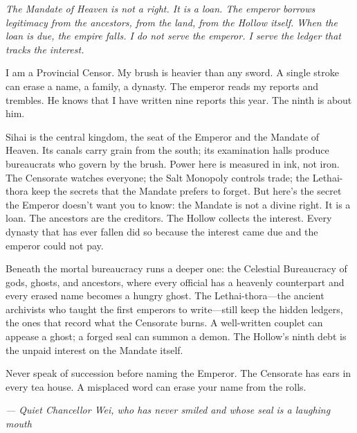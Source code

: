\noindent
{\Large
\textit{The Mandate of Heaven is not a right. It is a loan. The emperor borrows legitimacy from the ancestors, from the land, from the Hollow itself. When the loan is due, the empire falls. I do not serve the emperor. I serve the ledger that tracks the interest.}

\vspace{0.5em}

I am a Provincial Censor. My brush is heavier than any sword. A single stroke can erase a name, a family, a dynasty. The emperor reads my reports and trembles. He knows that I have written nine reports this year. The ninth is about him.

\vspace{0.5em}

Sihai is the central kingdom, the seat of the Emperor and the Mandate of Heaven. Its canals carry grain from the south; its examination halls produce bureaucrats who govern by the brush. Power here is measured in ink, not iron. The Censorate watches everyone; the Salt Monopoly controls trade; the Lethai-thora keep the secrets that the Mandate prefers to forget. But here's the secret the Emperor doesn't want you to know: the Mandate is not a divine right. It is a loan. The ancestors are the creditors. The Hollow collects the interest. Every dynasty that has ever fallen did so because the interest came due and the emperor could not pay.

\vspace{0.5em}

Beneath the mortal bureaucracy runs a deeper one: the Celestial Bureaucracy of gods, ghosts, and ancestors, where every official has a heavenly counterpart and every erased name becomes a hungry ghost. The Lethai-thora---the ancient archivists who taught the first emperors to write---still keep the hidden ledgers, the ones that record what the Censorate burns. A well-written couplet can appease a ghost; a forged seal can summon a demon. The Hollow's ninth debt is the unpaid interest on the Mandate itself.

\vspace{0.5em}

Never speak of succession before naming the Emperor. The Censorate has ears in every tea house. A misplaced word can erase your name from the rolls.

\vspace{1em}

\noindent\textit{--- Quiet Chancellor Wei, who has never smiled and whose seal is a laughing mouth}
}

